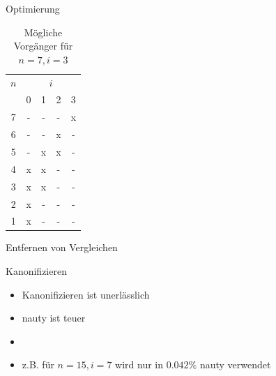 \begin{frame}{Optimierung}
  \begin{table}[!t]
    \renewcommand{\arraystretch}{1.2}
    \centering
    \begin{tabular}{c|cccc}
      $n$ & \multicolumn{4}{c}{$i$}             \\
          & 0                       & 1 & 2 & 3 \\ \hline
      7   & -                       & - & - & x \\
      6   & -                       & - & x & - \\
      5   & -                       & x & x & - \\
      4   & x                       & x & - & - \\
      3   & x                       & x & - & - \\
      2   & x                       & - & - & - \\
      1   & x                       & - & - & - \\
    \end{tabular}%
    \caption{Mögliche Vorgänger für $n = 7,i = 3$}
  \end{table}
\end{frame}

\begin{frame}{Entfernen von Vergleichen}
  \centering
  
\end{frame}

\begin{frame}{Kanonifizieren}
  \begin{itemize}
    \item<+-> Kanonifizieren ist unerlässlich
    \item<+-> nauty ist teuer
    \item<+->
    \item<+-> z.B. für $n=15,i=7$ wird nur in $0.042\%$ nauty verwendet
  \end{itemize}
\end{frame}

